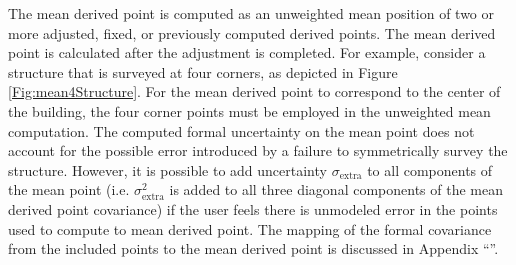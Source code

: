 The mean derived point is computed as an unweighted mean position of two or more adjusted, fixed, or previously computed derived points.  The mean derived point is calculated after the adjustment is completed.  For example, consider a structure that is surveyed at four corners, as depicted in Figure \ref{Fig:mean4Structure}.  For the mean derived point to correspond to the center of the building, the four corner points must be employed in the unweighted mean computation.  The computed formal uncertainty on the mean point does not account for the possible error introduced by a failure to symmetrically survey the structure.  However, it is possible to add uncertainty $\sigma_{\text{extra}}$ to all components of the mean point (i.e. $\sigma_{\text{extra}}^2$ is added to all three diagonal components of the mean derived point covariance) if the user feels there is unmodeled error in the points used to compute to mean derived point. The mapping of the formal covariance from the included points to the mean derived point is discussed in Appendix ``''.

